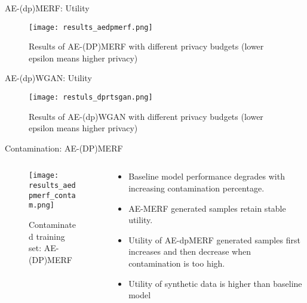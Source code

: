 \begin{frame}{AE-(dp)MERF: Utility}
    \begin{figure}
        \centering
        \texttt{[image: results\_aedpmerf.png]}
        \caption{Results of AE-(DP)MERF with different privacy budgets (lower epsilon means higher privacy)}
        \label{fig:enter-label}
    \end{figure}
\end{frame}

\begin{frame}{AE-(dp)WGAN: Utility}
    \begin{figure}
        \centering
        \texttt{[image: restuls\_dprtsgan.png]}
        \caption{Results of AE-(dp)WGAN with different privacy budgets (lower epsilon means higher privacy)}
        \label{fig:enter-label}
    \end{figure}
\end{frame}



\begin{frame}{Contamination: AE-(DP)MERF}
    \begin{columns}
        \begin{column}{0.65\textwidth}
            \begin{figure}

                \centering
                \texttt{[image: results\_aedpmerf\_contam.png]}
        
                \caption{Contaminated training set: AE-(DP)MERF}
        
            \end{figure}
        \end{column}
        \begin{column}{0.34\textwidth}
            \begin{itemize}
                \scriptsize
                \item \alert{Baseline model} performance degrades with increasing contamination percentage.
                \item \alert{AE-MERF} generated samples retain stable utility.
                \item Utility of \alert{AE-dpMERF} generated samples first increases and then decrease when contamination is too high.
                \item Utility of synthetic data is higher than baseline model    
            \end{itemize}
        \end{column}
    \end{columns}
    
\end{frame}